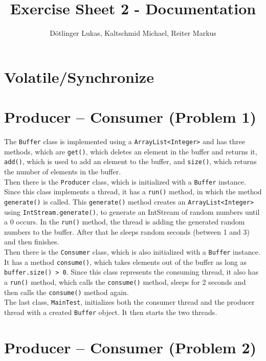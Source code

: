\documentclass{article}
\begin{document}
	\title{Exercise Sheet 2 - Documentation}
	\date{}
	\author{Dötlinger Lukas, Kaltschmid Michael, Reiter Markus}

	\maketitle

	\section{Volatile/Synchronize}

  \section{Producer – Consumer (Problem 1)}
  
  The \texttt{Buffer} class is implemented using a \texttt{ArrayList<Integer>} and has three methods, which are \texttt{get()}, which deletes an element in the buffer and returns it, \texttt{add()}, which is used to add an element to the buffer, and \texttt{size()}, which returns the number of elements in the buffer.\\
  Then there is the \texttt{Producer} class, which is initialized with a \texttt{Buffer} instance. Since this class implements a thread, it has a \texttt{run()} method, in which the method \texttt{generate()} is called. This \texttt{generate()} method creates an \texttt{ArrayList<Integer>} using \texttt{IntStream.generate()}, to generate an IntStream of random numbers until a 0 occurs. In the \texttt{run()} method, the thread is adding the generated random numbers to the buffer. After that he sleeps random seconds (between 1 and 3) and then finishes.\\
  Then there is the \texttt{Consumer} class, which is also initialized with a \texttt{Buffer} instance. It has a method \texttt{consume()}, which takes elements out of the buffer as long as \texttt{buffer.size() > 0}. Since this class represents the consuming thread, it also has a \texttt{run()} method, which calls the \texttt{consume()} method, sleeps for 2 seconds and then calls the \texttt{consume()} method again.\\
  The last class, \texttt{MainTest}, initializes both the consumer thread and the producer thread with a created \texttt{Buffer} object. It then starts the two threads.\\

  \section{Producer – Consumer (Problem 2)}
\end{document}
